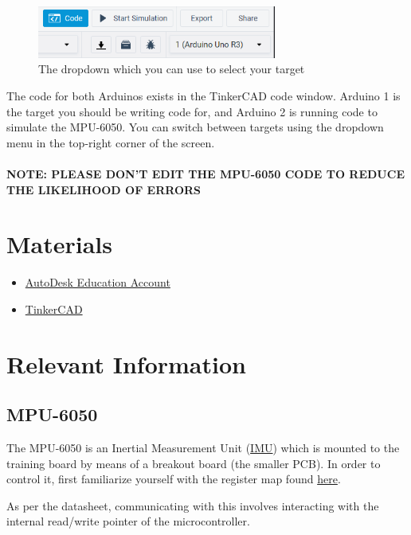 \documentclass{article}
\begin{document}
        \begin{figure}[ht]
            \centering
            \includegraphics[width = 0.7\textwidth]{img/TinkerCadCode.PNG}
            \caption{The dropdown which you can use to select your target}
        \end{figure}
        
        The code for both Arduinos exists in the TinkerCAD code window. Arduino 1 is the target you should be writing code for, and Arduino 2 is running code to simulate the MPU-6050. You can switch between targets using the dropdown menu in the top-right corner of the screen. 
        \\ \\
        \textbf{NOTE: PLEASE DON'T EDIT THE MPU-6050 CODE TO REDUCE THE LIKELIHOOD OF ERRORS}
        
\section{Materials}
\begin{itemize}
	\item \href{https://www.autodesk.com/education/edu-software/overview}{AutoDesk Education Account}
	\item \href{https://www.tinkercad.com/things/16XnuyNUjCb}{TinkerCAD}
\end{itemize}

\section{Relevant Information}
    \subsection{MPU-6050} \label{readwrite}
        The MPU-6050 is an Inertial Measurement Unit (\href{https://en.wikipedia.org/wiki/Inertial_measurement_unit}{IMU}) which is mounted to the training board by means of a breakout board (the smaller PCB).  
        In order to control it, first familiarize yourself with the register map found \href{https://cdn.sparkfun.com/datasheets/Sensors/Accelerometers/RM-MPU-6000A.pdf}{here}.
        
        As per the datasheet, communicating with this involves interacting with the internal read/write pointer of the microcontroller. \\
        
\end{document}

